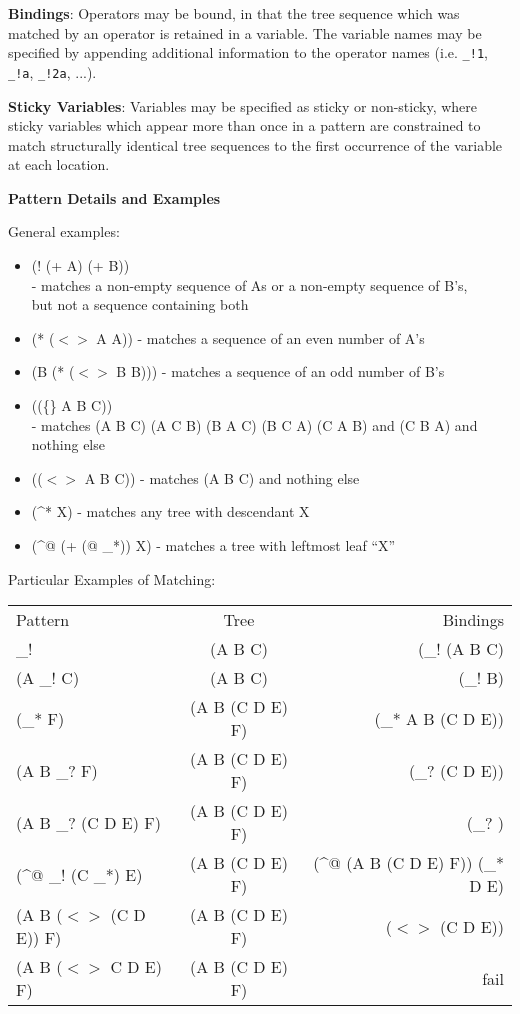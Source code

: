\documentclass[11pt]{article}
\begin{document}
{\bf Bindings}:
Operators may be bound, in that the tree sequence which was matched by an operator is retained in a variable.   The variable names may be specified by appending additional information to the operator names (i.e.  \texttt{\_!1}, \texttt{\_!a}, \texttt{\_!2a}, ...).    

{\bf Sticky Variables}:
Variables may be specified as sticky or non-sticky, where sticky variables which appear more than once in a pattern are constrained to match structurally identical tree sequences to the first occurrence of the variable at each location.


{\bf Pattern Details and Examples}

  General examples:\\
  \begin{itemize}
  \item (! (+ A) (+ B)) \\-   matches a non-empty sequence of As or a non-empty sequence of B's, \\but not a sequence containing both
  \item (* ($<>$ A A))  -   matches a sequence of an even number of A's
  \item (B (* ($<>$ B B)))  -  matches a sequence of an odd number of B's
  \item ((\{\} A B C))  \\-   matches (A B C) (A C B) (B A C) (B C A) (C A B) and (C B A) and nothing else
  \item (($<>$ A B C))   -  matches (A B C) and nothing else
  \item (\^{}* X)  -   matches any tree with descendant X
  \item (\^{}@ (+  (@ \_*)) X)  -  matches a tree with leftmost leaf ``X''
  \end{itemize}

  Particular Examples of Matching:
  \begin{tabular} {l c r}
    Pattern  & Tree &   Bindings\\
    \_!   & (A B C) & (\_! (A B C)\\
    (A \_! C)     &        (A B C)   &              (\_! B)\\
    (\_* F)       &        (A B (C D E) F)   &      (\_*  A B (C D E))\\
    (A B \_? F)   &        (A B (C D E) F)   &      (\_? (C D E))\\
    (A B \_? (C D E) F)  & (A B (C D E) F)   &      (\_? )\\
    (\^{}@ \_! (C \_*) E)   & (A B (C D E) F)   &   (\^{}@ (A B (C D E) F))  (\_* D E)\\
    (A B ($<>$ (C D E)) F)  & (A B (C D E) F)   &   ($<>$ (C D E))\\
    (A B ($<>$ C D E) F)    & (A B (C D E) F)  &   fail\\
  \end{tabular}
\end{document}
